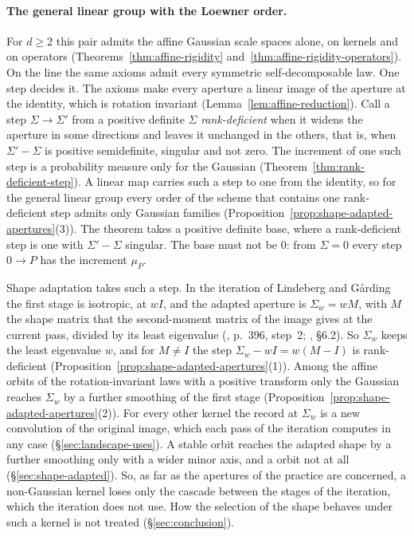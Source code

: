 \paragraph{The general linear group with the Loewner order.} For $d \ge 2$ this pair admits the affine
Gaussian scale spaces alone, on kernels and on operators (Theorems~\ref{thm:affine-rigidity}
and~\ref{thm:affine-rigidity-operators}). On the line the same axioms admit every symmetric
self-decomposable law. One step decides it. The axioms make every aperture a linear image of the
aperture at the identity, which is rotation invariant (Lemma~\ref{lem:affine-reduction}). Call a step
$\Sigma \to \Sigma'$ from a positive definite $\Sigma$ \emph{rank-deficient} when it widens the
aperture in some directions and leaves it unchanged in the others, that is, when $\Sigma' - \Sigma$ is
positive semidefinite, singular and not zero. The increment of one such step is a probability measure
only for the Gaussian (Theorem~\ref{thm:rank-deficient-step}). A linear map carries such a step to one
from the identity, so for the general linear group every order of the scheme that contains one
rank-deficient step admits only Gaussian families
(Proposition~\ref{prop:shape-adapted-apertures}(3)). The theorem takes a positive definite base, where a rank-deficient step is one with $\Sigma' - \Sigma$ singular.
The base must not be $0$: from $\Sigma = 0$ every step $0 \to P$ has the increment $\mu_P$.

Shape adaptation takes such a step. In the iteration of Lindeberg and G\aa{}rding the first stage is
isotropic, at $wI$, and the adapted aperture is $\Sigma_w = wM$, with $M$ the shape matrix that the
second-moment matrix of the image gives at the current pass, divided by its least eigenvalue (, p.~396, step~2;
, \S6.2). So $\Sigma_w$ keeps the least eigenvalue $w$, and for $M \ne I$
the step $\Sigma_w - wI = w(M - I)$ is rank-deficient (Proposition~\ref{prop:shape-adapted-apertures}(1)).
Among the affine orbits of the rotation-invariant laws with a positive transform only the Gaussian
reaches $\Sigma_w$ by a further smoothing of the first stage
(Proposition~\ref{prop:shape-adapted-apertures}(2)). For every other kernel the record at $\Sigma_w$
is a new convolution of the original image, which each pass of the iteration computes in any case
(\S\ref{sec:landscape-uses}). A stable orbit reaches the adapted shape by a further smoothing only with
a wider minor axis, and a \Matern{} orbit not at all (\S\ref{sec:shape-adapted}). So, as far as the apertures of the practice are concerned, a non-Gaussian kernel loses only the
cascade between the stages of the iteration, which the iteration does not use. How the selection of
the shape behaves under such a kernel is not treated (\S\ref{sec:conclusion}).

